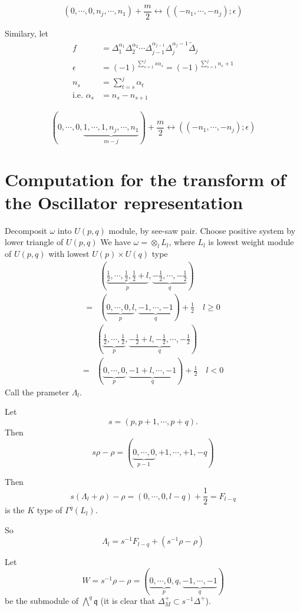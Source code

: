 \documentclass[12pt]{article}
\def\tDelta{\widetilde{\Delta}}
\def\fqq{\mathfrak{q}}
\begin{document}
\[
(0,\cdots, 0, n_j, \cdots, n_1)+\frac{m}{2}
\leftrightarrow
((-n_1, \cdots, -n_j); \epsilon)
\]

Similary, let
\begin{align*}
f &= \Delta_1^{\alpha_1}\Delta_2^{\alpha_2} \cdots \Delta_{j-1}^{\alpha_{j-1}}\Delta_j^{\alpha_j-1}\tDelta_j\\
\epsilon &= (-1)^{\sum_{s=1}^j s\alpha_s} = (-1)^{\sum_{s=1}^j n_s+1}\\
n_s &= \sum_{t=s}^j \alpha_t\\
\text{i.e. } \alpha_s &= n_s-n_{s+1}
\end{align*}

\[
(0,\cdots, 0,\underbrace{1, \cdots, 1, n_j, \cdots, n_1}_{m-j})+\frac{m}{2}
\leftrightarrow
((-n_1, \cdots, -n_j); \epsilon)
\]

\section{Computation for the transform of the Oscillator representation}
Decomposit $\omega$ into $U(p,q)$ module, by see-saw pair.
Choose positive system by lower triangle of $U(p,q)$
We have
$\omega = \otimes_{l} L_l$, 
where $L_l$ is lowest weight module of $U(p,q)$ with lowest $U(p)\times U(q)$ 
type
\[
\begin{split}
&(\underbrace{\frac{1}{2},\cdots, \frac{1}{2}, \frac{1}{2}+l}_p, 
\underbrace{-\frac{1}{2},\cdots, -\frac{1}{2}}_q)\\
=&
(\underbrace{0, \cdots, 0, l}_p, 
\underbrace{-1,\cdots, -1}_q)+\frac{1}{2}
\quad l \geq 0
\end{split}
\]
\[
\begin{split}
&(\underbrace{\frac{1}{2},\cdots, \frac{1}{2}}_p,  
\underbrace{-\frac{1}{2}+l,-\frac{1}{2},\cdots, -\frac{1}{2}}_q)\\
=&
(\underbrace{0, \cdots,  0}_p, 
\underbrace{-1+l,\cdots, -1}_q)+\frac{1}{2}
\quad l < 0
\end{split}
\]
Call the prameter $\Lambda_l$.

Let \[s = (p,p+1,\cdots, p+q).\]
Then 
\[
s\rho-\rho = (\underbrace{0,\cdots,0}_{p-1},+1,\cdots, +1, -q)
\]

Then 
\[
s(\Lambda_l+\rho)-\rho = (0, \cdots, 0, l-q) +\frac{1}{2}
=F_{l-q}
\]
is the $K$ type of $\Gamma^q(L_l)$. 

So 
\[
\Lambda_l =  s^{-1} F_{l-q} + (s^{-1}\rho -\rho)
\]

Let 
\[
W= s^{-1}\rho -\rho
= (\underbrace{0,\cdots, 0, q}_p, \underbrace{-1, \cdots, -1}_q)
\]
 be the submodule of $\bigwedge^q \fqq$ (it is clear that $\Delta^+_M\subset s^{-1}\Delta^+$). 
\end{document}
